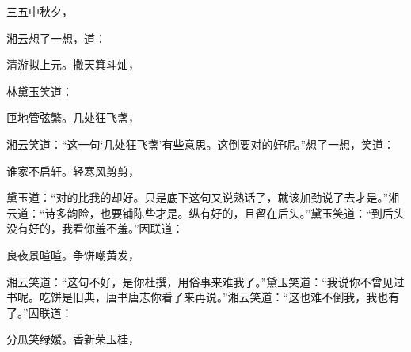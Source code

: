 \begin{poem}
    \begin{pl}三五中秋夕，\end{pl}
\end{poem}


\begin{parag}
    湘云想了一想，道：
\end{parag}


\begin{poem}
    \begin{pl} 清游拟上元。撒天箕斗灿，\end{pl}
\end{poem}


\begin{parag}
    林黛玉笑道：
\end{parag}


\begin{poem}
    \begin{pl}
        匝地管弦繁。几处狂飞盏，
    \end{pl}
\end{poem}


\begin{parag}
    湘云笑道：“这一句‘几处狂飞盏’有些意思。这倒要对的好呢。”想了一想，笑道：
\end{parag}


\begin{poem}
    \begin{pl}
        谁家不启轩。轻寒风剪剪，
    \end{pl}
\end{poem}


\begin{parag}
    黛玉道：“对的比我的却好。只是底下这句又说熟话了，就该加劲说了去才是。”湘云道：“诗多韵险，也要铺陈些才是。纵有好的，且留在后头。”黛玉笑道：“到后头没有好的，我看你羞不羞。”因联道：
\end{parag}


\begin{poem}
    \begin{pl}
        良夜景暄暄。争饼嘲黄发，
    \end{pl}
\end{poem}


\begin{parag}
    湘云笑道：“这句不好，是你杜撰，用俗事来难我了。”黛玉笑道：“我说你不曾见过书呢。吃饼是旧典，唐书唐志你看了来再说。”湘云笑道：“这也难不倒我，我也有了。”因联道：
\end{parag}


\begin{poem}
    \begin{pl}
        分瓜笑绿嫒。香新荣玉桂，
    \end{pl}
\end{poem}


